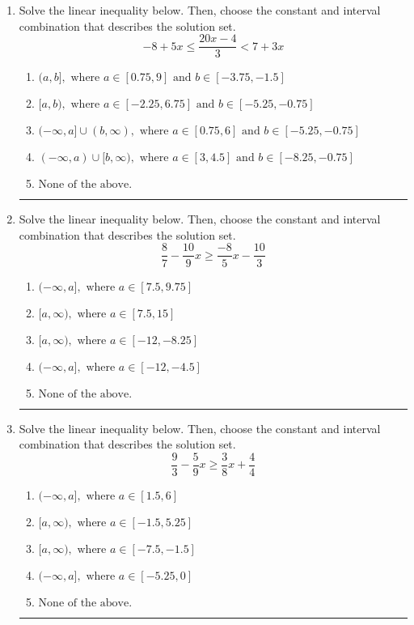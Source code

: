 \documentclass[14pt]{extbook}
\newcommand{\litem}[1]{\item#1\hspace*{-1cm}\rule{\textwidth}{0.4pt}}
\begin{document}
\begin{enumerate}
\litem{
Solve the linear inequality below. Then, choose the constant and interval combination that describes the solution set.\[ -8 + 5 x \leq \frac{20 x - 4}{3} < 7 + 3 x \]\begin{enumerate}[label=\Alph*.]
\item \( (a, b], \text{ where } a \in [0.75, 9] \text{ and } b \in [-3.75, -1.5] \)
\item \( [a, b), \text{ where } a \in [-2.25, 6.75] \text{ and } b \in [-5.25, -0.75] \)
\item \( (-\infty, a] \cup (b, \infty), \text{ where } a \in [0.75, 6] \text{ and } b \in [-5.25, -0.75] \)
\item \( (-\infty, a) \cup [b, \infty), \text{ where } a \in [3, 4.5] \text{ and } b \in [-8.25, -0.75] \)
\item \( \text{None of the above.} \)

\end{enumerate} }
\litem{
Solve the linear inequality below. Then, choose the constant and interval combination that describes the solution set.\[ \frac{8}{7} - \frac{10}{9} x \geq \frac{-8}{5} x - \frac{10}{3} \]\begin{enumerate}[label=\Alph*.]
\item \( (-\infty, a], \text{ where } a \in [7.5, 9.75] \)
\item \( [a, \infty), \text{ where } a \in [7.5, 15] \)
\item \( [a, \infty), \text{ where } a \in [-12, -8.25] \)
\item \( (-\infty, a], \text{ where } a \in [-12, -4.5] \)
\item \( \text{None of the above}. \)

\end{enumerate} }
\litem{
Solve the linear inequality below. Then, choose the constant and interval combination that describes the solution set.\[ \frac{9}{3} - \frac{5}{9} x \geq \frac{3}{8} x + \frac{4}{4} \]\begin{enumerate}[label=\Alph*.]
\item \( (-\infty, a], \text{ where } a \in [1.5, 6] \)
\item \( [a, \infty), \text{ where } a \in [-1.5, 5.25] \)
\item \( [a, \infty), \text{ where } a \in [-7.5, -1.5] \)
\item \( (-\infty, a], \text{ where } a \in [-5.25, 0] \)
\item \( \text{None of the above}. \)


\end{enumerate}}
\end{enumerate}
\end{document}
